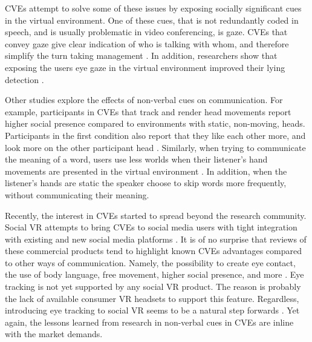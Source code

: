 \documentclass[]{simple-thesis}
\begin{document}
CVEs attempt to solve some of these issues by exposing socially significant cues in the virtual environment.
One of these cues, that is not redundantly coded in speech, and is usually problematic in video conferencing, is gaze.
CVEs that convey gaze give clear indication of who is talking with whom, and therefore simplify the turn taking management \citep{Vertegaal1999, Vertegaal2003}.
In addition, researchers show that exposing the users eye gaze in the virtual environment improved their lying detection \citep{Steptoe2010}.

Other studies explore the effects of non-verbal cues on communication.
For example, participants in CVEs that track and render head movements report higher social presence compared to environments with static, non-moving, heads.
Participants in the first condition also report that they like each other more, and look more on the other participant head \citep{Bailenson2002}.
Similarly, when trying to communicate the meaning of a word, users use less worlds when their listener's hand movements are presented in the virtual environment \citep{Dodds2011}.
In addition, when the listener's hands are static the speaker choose to skip words more frequently, without communicating their meaning.

Recently, the interest in CVEs started to spread beyond the research community.
Social VR attempts to bring CVEs to social media users with tight integration with existing and new social media platforms \citep{Bonasio2016}.
It is of no surprise that reviews of these commercial products tend to highlight known CVEs advantages compared to other ways of communication.
Namely, the possibility to create eye contact, the use of body language, free movement, higher social presence, and more \citep{Rosedale2015}.
Eye tracking is not yet supported by any social VR product.
The reason is probably the lack of available consumer VR headsets to support this feature.
Regardless, introducing eye tracking to social VR seems to be a natural step forwards \citep{Langley2017}.
Yet again, the lessons learned from research in non-verbal cues in CVEs are inline with the market demands.
\end{document}
